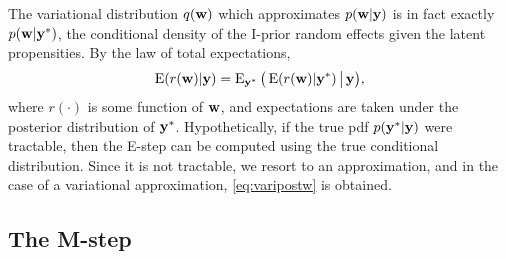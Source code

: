 \begin{remark}
  The variational distribution $q({\mathbf w})$ which approximates $p({\mathbf w}|{\mathbf y})$ is in fact exactly $p({\mathbf w}|{\mathbf y}^*)$, the conditional density of the I-prior random effects given the latent propensities.
  By the law of total expectations, 
  \begin{gather*}
    \operatorname{E}(r({\mathbf w})|{\mathbf y}) = \operatorname{E}_{{\mathbf y}^*}\big( \operatorname{E}(r({\mathbf w})|{\mathbf y}^*) \,\big|\, {\mathbf y} \big),
  \end{gather*}
  where $r(\cdot)$ is some function of ${\mathbf w}$, and expectations are taken under the posterior distribution of ${\mathbf y}^*$.
  Hypothetically, if the true pdf $p({\mathbf y}^*|{\mathbf y})$ were tractable,  then the E-step can be computed using the true conditional distribution.
  Since it is not tractable, we resort to an approximation, and in the case of a variational approximation, \cref{eq:varipostw} is obtained.
\end{remark}

\subsection{The M-step}
\label{sec:varupdeta}

